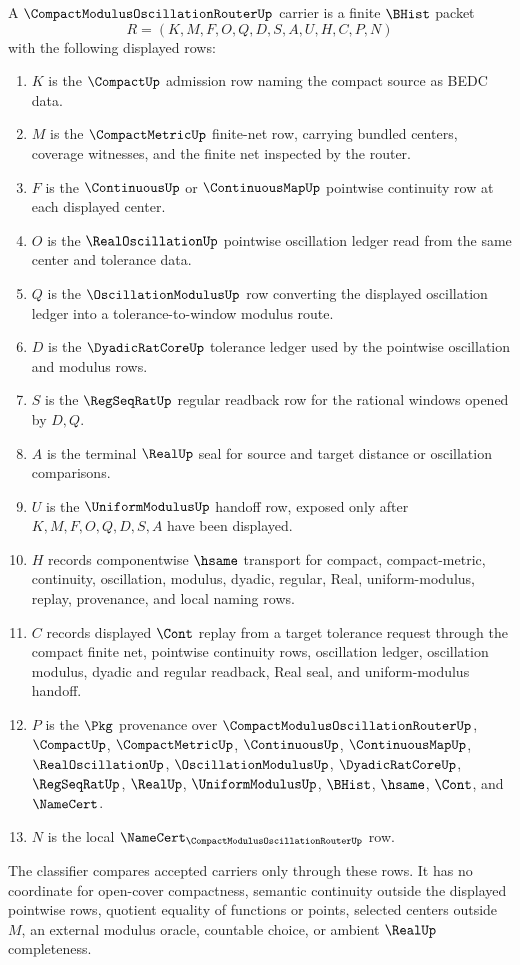\begin{definition}
\label{def:compact-modulus-oscillation-router-carrier}
A $\CompactModulusOscillationRouterUp$ carrier is a finite $\BHist$ packet
$$
R=(K,M,F,O,Q,D,S,A,U,H,C,P,N)
$$
with the following displayed rows:
\begin{enumerate}
\item $K$ is the $\CompactUp$ admission row naming the compact source as BEDC data.
\item $M$ is the $\CompactMetricUp$ finite-net row, carrying bundled centers, coverage witnesses, and the finite net inspected by the router.
\item $F$ is the $\ContinuousUp$ or $\ContinuousMapUp$ pointwise continuity row at each displayed center.
\item $O$ is the $\RealOscillationUp$ pointwise oscillation ledger read from the same center and tolerance data.
\item $Q$ is the $\OscillationModulusUp$ row converting the displayed oscillation ledger into a tolerance-to-window modulus route.
\item $D$ is the $\DyadicRatCoreUp$ tolerance ledger used by the pointwise oscillation and modulus rows.
\item $S$ is the $\RegSeqRatUp$ regular readback row for the rational windows opened by $D,Q$.
\item $A$ is the terminal $\RealUp$ seal for source and target distance or oscillation comparisons.
\item $U$ is the $\UniformModulusUp$ handoff row, exposed only after $K,M,F,O,Q,D,S,A$ have been displayed.
\item $H$ records componentwise $\hsame$ transport for compact, compact-metric, continuity, oscillation, modulus, dyadic, regular, Real, uniform-modulus, replay, provenance, and local naming rows.
\item $C$ records displayed $\Cont$ replay from a target tolerance request through the compact finite net, pointwise continuity rows, oscillation ledger, oscillation modulus, dyadic and regular readback, Real seal, and uniform-modulus handoff.
\item $P$ is the $\Pkg$ provenance over $\CompactModulusOscillationRouterUp$, $\CompactUp$, $\CompactMetricUp$, $\ContinuousUp$, $\ContinuousMapUp$, $\RealOscillationUp$, $\OscillationModulusUp$, $\DyadicRatCoreUp$, $\RegSeqRatUp$, $\RealUp$, $\UniformModulusUp$, $\BHist$, $\hsame$, $\Cont$, and $\NameCert$.
\item $N$ is the local $\NameCert_{\CompactModulusOscillationRouterUp}$ row.
\end{enumerate}
The classifier compares accepted carriers only through these rows. It has no coordinate for open-cover compactness, semantic continuity outside the displayed pointwise rows, quotient equality of functions or points, selected centers outside $M$, an external modulus oracle, countable choice, or ambient $\RealUp$ completeness.
\end{definition}

